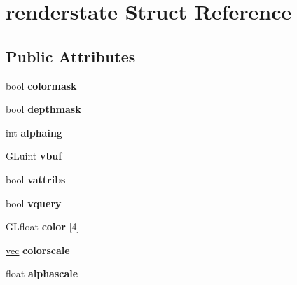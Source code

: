 \hypertarget{structrenderstate}{}\section{renderstate Struct Reference}
\label{structrenderstate}
\subsection*{Public Attributes}
\begin{DoxyCompactItemize}
\item 
\mbox{\label{structrenderstate_a185290419168e669983fa52dbf8ab153}} 
bool {\bfseries colormask}
\item 
\mbox{\label{structrenderstate_a988cd85474d026c5329f884f71456828}} 
bool {\bfseries depthmask}
\item 
\mbox{\label{structrenderstate_aefecc9cbe841ceb70ae2da6d13386f0e}} 
int {\bfseries alphaing}
\item 
\mbox{\label{structrenderstate_ace2317d6c0404872a23993795ea1c4f4}} 
G\+Luint {\bfseries vbuf}
\item 
\mbox{\label{structrenderstate_a5ada9bbef69b0028c13f6d00f0f15f88}} 
bool {\bfseries vattribs}
\item 
\mbox{\label{structrenderstate_a3409abec3890401a77d0ded12f03bdee}} 
bool {\bfseries vquery}
\item 
\mbox{\label{structrenderstate_afd6b1c280a953bf76d9b7ebfab2678db}} 
G\+Lfloat {\bfseries color} \mbox{[}4\mbox{]}
\item 
\mbox{\label{structrenderstate_a257b191a8504706d595d790e11c25347}} 
\hyperlink{structvec}{vec} {\bfseries colorscale}
\item 
\mbox{\label{structrenderstate_a1bc351a5f9f88e35ae8edc4c0c5e5138}} 
float {\bfseries alphascale}
\item 
\mbox{\label{structrenderstate_a83a052ad14936d7b80a6a6eb799d5ae0}} 

\end{DoxyCompactItemize}
